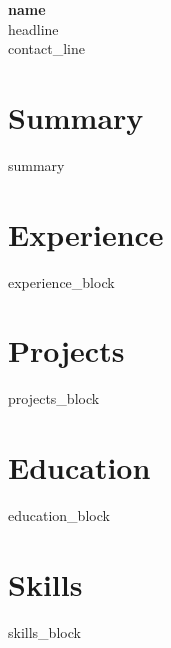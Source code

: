 \documentclass[10pt,a4paper]{article}
\begin{document}
\begin{center}
  {\Large\bfseries {{name}}}\\[2pt]
  {\small {{headline}}}\\[2pt]
  {\small {{contact_line}}}
\end{center}

\section*{Summary}
{{summary}}

\section*{Experience}
{{experience_block}}

\section*{Projects}
{{projects_block}}

\section*{Education}
{{education_block}}

\section*{Skills}
{{skills_block}}
\end{document}
